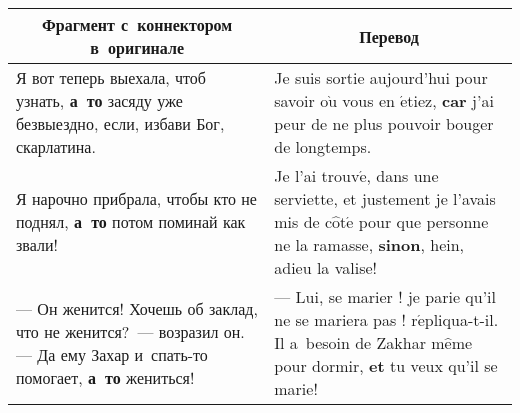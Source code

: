 \begin{table*}\small %
\begin{center}
\vspace*{2ex}

\begin{tabular}{|p{79mm}|p{79mm}|}
\hline
\multicolumn{1}{|c|}{\textbf{Фрагмент с~коннектором в~оригинале}}& \multicolumn{1}{c|}{\textbf{Перевод}}\\
\hline
Я вот теперь выехала, чтоб узнать, \textbf{а~то} засяду уже безвыездно, если, избави Бог, 
скарлатина.&Je suis sortie aujourd'hui pour savoir o$\grave{\mbox{u}}$ vous en 
$\acute{\mbox{e}}$tiez, \textbf{car} j'ai peur de ne plus pouvoir bouger de longtemps.\\
\hline
Я нарочно прибрала, чтобы кто не поднял, \textbf{а~то} потом поминай как звали!&Je l'ai trouv$\acute{\mbox{e}}$, dans une 
serviette, et justement je l'avais mis de c$\hat{\mbox{o}}$t$\acute{\mbox{e}}$ pour que personne ne 
la ramasse, \textbf{sinon}, hein, adieu la valise!\\
\hline
--- Он женится! Хочешь об заклад, что не женится?~--- возразил он. --- Да ему Захар и~спать-то 
помогает, \textbf{а~то} жениться!&--- Lui, se marier ! je parie qu'il ne se mariera pas ! 
r$\acute{\mbox{e}}$pliqua-t-il. Il a~besoin de Zakhar m$\hat{\mbox{e}}$me pour dormir, \textbf{et} 
tu veux qu'il se marie!\\
\hline
\end{tabular}
\end{center}
   \vspace*{-3pt}
   \begin{center}
   \vspace*{2ex}
   

\end{center}
\end{table*}
